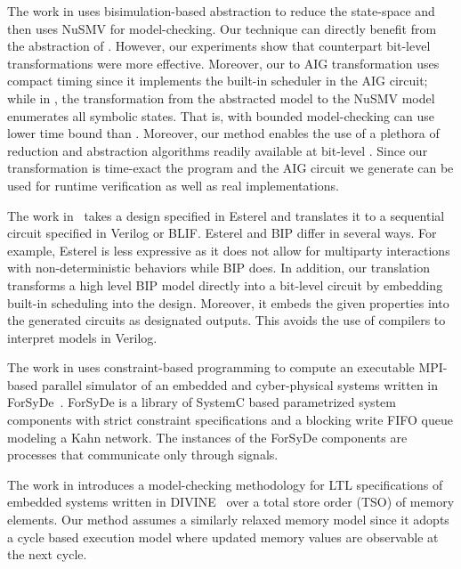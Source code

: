 The work in \cite{facs14} uses bisimulation-based abstraction to reduce the state-space and then uses NuSMV for model-checking. Our technique can directly benefit from the abstraction of \cite{facs14}. However, our experiments show that counterpart bit-level transformations were more effective. Moreover, our \caig to AIG transformation uses compact timing since it implements the built-in scheduler in the AIG circuit; while in \cite{facs14}, the transformation from the abstracted model to the NuSMV model enumerates all symbolic states. That is, with \biptool{} bounded model-checking can use lower time bound than \cite{facs14}. Moreover, our method enables the use of a plethora of reduction and abstraction algorithms readily available at bit-level \cite{brayton2010abc}. 
Since our transformation is time-exact the \caig program and the AIG circuit we generate can be used for runtime verification as well as real implementations. 


The work in~\cite{CompilingEsterel} takes a design specified in Esterel
and translates it to a sequential circuit specified in Verilog or BLIF. 
%
%
Esterel and BIP differ in several ways.
For example, Esterel is less expressive as it does not allow for multiparty
interactions with non-deterministic behaviors while BIP does.
%
In addition,
our translation transforms a high level BIP model directly into a
bit-level circuit by embedding built-in scheduling into
the design.
Moreover, it embeds the given properties into the
generated circuits as designated outputs.
This avoids the use of compilers to interpret
models in Verilog.

   

The work in \cite{NiakiDATAS13} uses constraint-based
programming to compute an executable 
MPI-based parallel simulator of an embedded and cyber-physical 
systems written in ForSyDe~\cite{SanderJ04}.
ForSyDe is a library of SystemC based 
parametrized system components with strict constraint 
specifications and a blocking write FIFO queue modeling 
a Kahn network. 
The instances of the ForSyDe components are processes that 
communicate only through signals. 

The work in \cite{BarnatVMCAI2013} introduces a model-checking
methodology for LTL specifications of embedded systems written 
in DIVINE~\cite{Divine}  over
a total store order (TSO) of memory elements. 
Our method assumes a similarly relaxed memory model
since it adopts a cycle based execution model where 
updated memory values are observable at the next cycle. 

